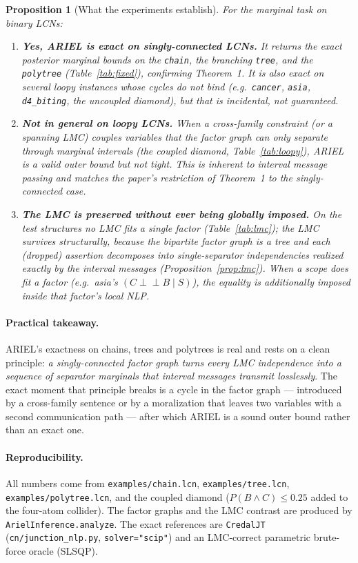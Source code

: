 \documentclass[11pt]{article}
\newtheorem{proposition}{Proposition}
\newcommand{\indep}{\perp\!\!\!\perp}
\begin{document}
\begin{proposition}[What the experiments establish]\label{prop:verdict}
For the marginal task on binary LCNs:
\begin{enumerate}
  \item[\textnormal{(i)}] \textbf{Yes, ARIEL is exact on singly-connected LCNs.} It returns the
    exact posterior marginal bounds on the \texttt{chain}, the branching \texttt{tree}, and the
    \texttt{polytree} (Table~\ref{tab:fixed}), confirming Theorem~1. It is also exact on several
    \emph{loopy} instances whose cycles do not bind (e.g.\ \texttt{cancer}, \texttt{asia},
    \texttt{d4\_biting}, the \emph{un}coupled diamond), but that is incidental, not guaranteed.
  \item[\textnormal{(ii)}] \textbf{Not in general on loopy LCNs.} When a cross-family constraint (or
    a spanning LMC) couples variables that the factor graph can only separate through marginal
    intervals (the coupled diamond, Table~\ref{tab:loopy}), ARIEL is a valid \emph{outer} bound but
    not tight. This is inherent to interval message passing and matches the paper's restriction of
    Theorem~1 to the singly-connected case.
  \item[\textnormal{(iii)}] \textbf{The LMC is preserved without ever being globally imposed.} On
    the test structures \emph{no} LMC fits a single factor (Table~\ref{tab:lmc}); the LMC survives
    structurally, because the bipartite factor graph is a tree and each (dropped) assertion
    decomposes into single-separator independencies realized exactly by the interval messages
    (Proposition~\ref{prop:lmc}). When a scope \emph{does} fit a factor (e.g.\ asia's
    $(C\indep B\mid S)$), the equality is additionally imposed inside that factor's local NLP.
\end{enumerate}
\end{proposition}

\paragraph{Practical takeaway.} ARIEL's exactness on chains, trees and polytrees is real and rests
on a clean principle: \emph{a singly-connected factor graph turns every LMC independence into a
sequence of separator marginals that interval messages transmit losslessly}. The exact moment that
principle breaks is a cycle in the factor graph --- introduced by a cross-family sentence or by a
moralization that leaves two variables with a second communication path --- after which ARIEL is a
sound outer bound rather than an exact one.

\paragraph{Reproducibility.} All numbers come from \texttt{examples/chain.lcn},
\texttt{examples/tree.lcn}, \texttt{examples/polytree.lcn}, and the coupled diamond
($P(B\land C)\le0.25$ added to the four-atom collider). The factor graphs and the LMC contrast are
produced by \texttt{ArielInference.analyze}. The exact references are \texttt{CredalJT}
(\texttt{cn/junction\_nlp.py}, \texttt{solver="scip"}) and an LMC-correct parametric brute-force
oracle (SLSQP).
\end{document}
